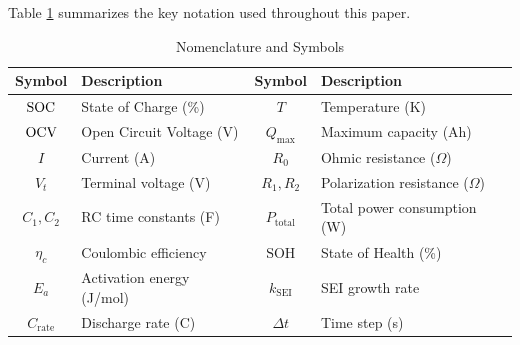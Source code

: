 Table \ref{tab:notation} summarizes the key notation used throughout this paper.

\begin{table}[H]
\centering
\caption{Nomenclature and Symbols}
\label{tab:notation}
\begin{tabular}{cl|cl}
\toprule
\textbf{Symbol} & \textbf{Description} & \textbf{Symbol} & \textbf{Description} \\
\midrule
$\text{SOC}$ & State of Charge (\%) & $T$ & Temperature (K) \\
$\text{OCV}$ & Open Circuit Voltage (V) & $Q_{\max}$ & Maximum capacity (Ah) \\
$I$ & Current (A) & $R_0$ & Ohmic resistance ($\Omega$) \\
$V_t$ & Terminal voltage (V) & $R_1, R_2$ & Polarization resistance ($\Omega$) \\
$C_1, C_2$ & RC time constants (F) & $P_{\text{total}}$ & Total power consumption (W) \\
$\eta_c$ & Coulombic efficiency & $\text{SOH}$ & State of Health (\%) \\
$E_a$ & Activation energy (J/mol) & $k_{\text{SEI}}$ & SEI growth rate \\
$C_{\text{rate}}$ & Discharge rate (C) & $\Delta t$ & Time step (s) \\
\bottomrule
\end{tabular}
\end{table}
